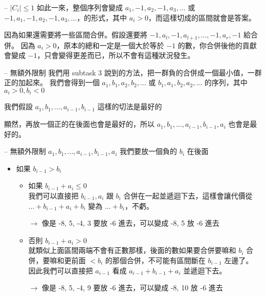 \documentclass[hyperref,UTF8,notheorems,xcolor={dvipsnames}]{beamer}
\newcommand{\btitle}[1]{{\secname} -- #1}
\theoremstyle{definition}
\begin{document}
\begin{frame}[fragile]{\btitle{$|C_i| \le 1$}}
	如此一來，整個序列會變成 $a_1, -1, a_2, -1, a_3, ...$ 或 $-1, a_1, -1, a_2, -1, a_3, ...$，的形式，其中 $a_i > 0$，而這樣切成的區間就會是答案。
	\pause

	因為如果還需要將一些區間合併。假設還要將 $-1, a_l, -1, a_{l + 1}, ..., -1, a_r, -1$ 給合併。
	因為 $a_i > 0$，原本的總和一定是一個大於等於 $-1$ 的數，你合併後他的貢獻會變成 $-1$，只會變得更差而已，所以不會有這種狀況發生。

\end{frame}

\begin{frame}[fragile]{\btitle{無額外限制}}
	我們用 subtask 3 說到的方法，把一群負的合併成一個最小值，一群正的加起來。
	我們會得到一個 $a_1, b_1, a_2, b_2, ...$ 或 $b_1, a_1, b_2, a_2,...$ 的序列，其中 $a_i > 0, b_i < 0$
	\pause

	我們假設 $a_1, b_1, ..., a_{i - 1}, b_{i - 1}$ 這樣的切法是最好的
	\pause

	顯然，再放一個正的在後面也會是最好的，所以 $a_1, b_1, ..., a_{i - 1}, b_{i - 1}, a_i$ 也會是最好的。
\end{frame}

\begin{frame}[fragile]{\btitle{無額外限制}}
	$a_1, b_1, ..., a_{i - 1}, b_{i - 1}, a_i$ 我們要放一個負的 $b_i$ 在後面
	\pause
	\begin{itemize}
		\item 如果 $b_{i - 1} > b_i$
		\pause
			\begin{itemize}
				\item 如果 $b_{i - 1} + a_{i} \le 0$ \\
				我們可以直接把 $b_{i - 1}, a_i$ 跟 $b_i$ 合併在一起並遞迴下去，這樣會讓代價從 $... + b_{i - 1} + a_{i} + b_{i}$ 變為 $... + b_i$，不虧。
				\pause

				\item[$\rightarrow$] 像是 -8, 5, -4, 3 要放 -6 進去，可以變成 -8, 5 放 -6 進去
				\pause
				\item 否則 $b_{i - 1} + a_{i} > 0$ \\
				就類似上面區間兩端不會有正數那樣，後面的數如果要合併要嘛和 $b_{i}$ 合併，要嘛和更前面 $< b_{i}$ 的那個合併，不可能有區間斷在 $b_{i - 1}$ 左邊了。 \\
				因此我們可以直接把 $a_{i - 1}$ 看成 $a_{i - 1} + b_{i - 1} + a_{i}$ 並遞迴下去。
				\pause

				\item[$\rightarrow$] 像是 -8, 5, -4, 9 要放 -6 進去，可以變成 -8, 10 放 -6 進去

			\end{itemize}

	\end{itemize}
	
\end{frame}
\end{document}
